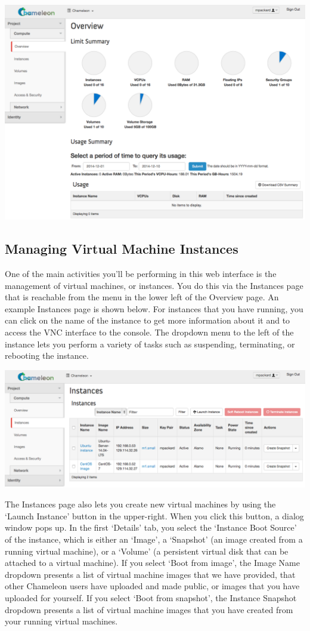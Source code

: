 \includegraphics[width=0.8\columnwidth]{images/chameleon/openstack_alamo_overview.png}

\subsection{Managing Virtual Machine Instances}\label{managing-virtual-machine-instances}

One of the main activities you'll be performing in this web interface is
the management of virtual machines, or instances. You do this via the
Instances page that is reachable from the menu in the lower left of the
Overview page. An example Instances page is shown below. For instances
that you have running, you can click on the name of the instance to get
more information about it and to access the VNC interface to the
console. The dropdown menu to the left of the instance lets you perform
a variety of tasks such as suspending, terminating, or rebooting the
instance.

\includegraphics[width=0.8\columnwidth]{images/chameleon/openstack_alamo_instances.png}

The Instances page also lets you create new virtual machines by using
the `Launch Instance' button in the upper-right. When you click this
button, a dialog window pops up. In the first `Details' tab, you select
the `Instance Boot Source' of the instance, which is either an `Image',
a `Snapshot' (an image created from a running virtual machine), or a
`Volume' (a persistent virtual disk that can be attached to a virtual
machine). If you select `Boot from image', the Image Name dropdown
presents a list of virtual machine images that we have provided, that
other Chameleon users have uploaded and made public, or images that you
have uploaded for yourself. If you select `Boot from snapshot', the
Instance Snapshot dropdown presents a list of virtual machine images
that you have created from your running virtual machines.

